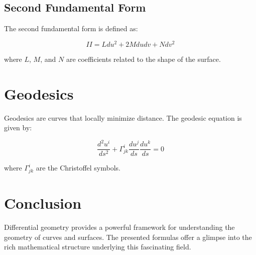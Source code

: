 \documentclass{article}
\begin{document}
\subsection{Second Fundamental Form}

The second fundamental form is defined as:

\begin{equation}
    II = L du^2 + 2M du dv + N dv^2
\end{equation}

where $L$, $M$, and $N$ are coefficients related to the shape of the surface.

\section{Geodesics}

Geodesics are curves that locally minimize distance. The geodesic equation is given by:

\begin{equation}
    \frac{d^2 u^i}{ds^2} + \Gamma_{jk}^i \frac{du^j}{ds} \frac{du^k}{ds} = 0
\end{equation}

where $\Gamma_{jk}^i$ are the Christoffel symbols.

\section{Conclusion}

Differential geometry provides a powerful framework for understanding the geometry of curves and surfaces. The presented formulas offer a glimpse into the rich mathematical structure underlying this fascinating field.
\end{document}
